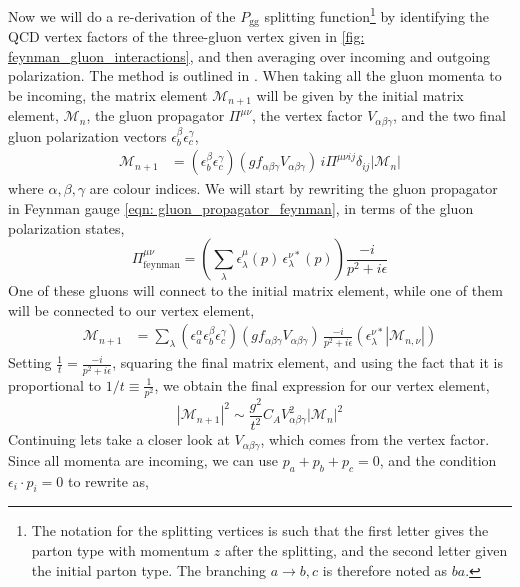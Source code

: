 \documentclass[main.tex]{subfiles}
\begin{document}
Now we will do a re-derivation of the \(P_{\text{gg}}\) splitting function\footnote{The notation for the splitting vertices is such that the first letter gives the parton type with momentum \(z\) after the splitting, and the second letter given the initial parton type. The branching \(a\rightarrow b,c\) is therefore noted as \(ba\).} by identifying the QCD vertex factors of the three-gluon vertex given in \autoref{fig: feynman_gluon_interactions}, and then averaging over incoming and outgoing polarization. The method is outlined in \cite{ellis_stirling_webber_1996}. When taking all the gluon momenta to be incoming, the matrix element \(\mathcal{M}_{n+1}\) will be given by the initial matrix element, \(\mathcal{M}_n\), the gluon propagator \(\Pi^{\mu\nu}\), the vertex factor \(V_{\alpha\beta\gamma}\), and the two final gluon polarization vectors \(\epsilon_b^\beta\epsilon_c^\gamma\), 
\begin{align}
    \mathcal{M}_{n+1} &=  \left( \epsilon_b^\beta \epsilon_c^\gamma  \right) \left(gf_{\alpha\beta\gamma} V_{\alpha\beta\gamma}\right)  \, i \Pi^{\mu\nu ij}\delta_{ij}  |\mathcal{M}_n|
\end{align}
where \(\alpha,\beta,\gamma\) are colour indices. We will start by rewriting the gluon propagator in Feynman gauge \autoref{eqn: gluon_propagator_feynman}, in terms of the gluon polarization states, 
\begin{equation}
    \Pi_{\text{feynman}}^{\mu\nu} = \left(\sum_\lambda \epsilon_\lambda^\mu(p)\, \epsilon_\lambda^{\nu*}(p) \right) \frac{-i}{p^2+i\epsilon}
\end{equation}
One of these gluons will connect to the initial matrix element, while one of them will be connected to our vertex element, 
\begin{align}
    \mathcal{M}_{n+1} &=  \sum_\lambda \left(\epsilon_a^\alpha \epsilon_b^\beta \epsilon_c^\gamma  \right) \left(gf_{\alpha\beta\gamma} V_{\alpha\beta\gamma}\right) \, \frac{-i}{p^2+i\epsilon} \left(\epsilon_\lambda^{\nu*} |\mathcal{M}_{n,\nu}|\right)
\end{align}
Setting \(\frac{1}{t} = \frac{-i}{p^2+i\epsilon} \), squaring the final matrix element, and using the fact that it is proportional to \(1/t\equiv \frac{1}{p^2}\), we obtain the final expression for our vertex element,
\begin{equation}\label{eqn: ggg_matrix_element}
    |\mathcal{M}_{n+1}|^2 \sim \frac{g^2}{t^2} C_A V_{\alpha\beta\gamma}^2  |\mathcal{M}_n|^2
\end{equation}
Continuing lets take a closer look at \(V_{\alpha\beta\gamma}\), which comes from the vertex factor. Since all momenta are incoming, we can use \(p_a +p_b +p_c = 0\), and the condition \(\epsilon_i \cdot p_i = 0\) to rewrite as,
\end{document}
